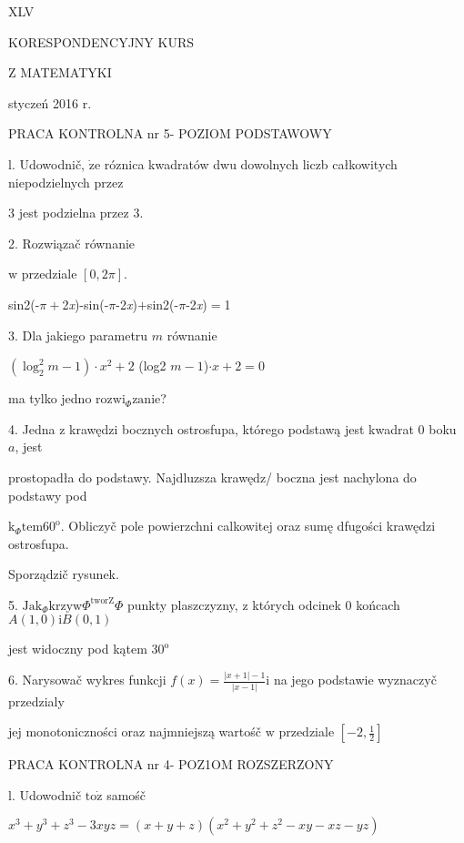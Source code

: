\documentclass[a4paper,12pt]{article}
\begin{document}
XLV

KORESPONDENCYJNY KURS

Z MATEMATYKI

styczeń 2016 r.

PRACA KONTROLNA nr 5- POZIOM PODSTAWOWY

l. Udowodnič, $\dot{\mathrm{z}}\mathrm{e}$ róznica kwadratów dwu dowolnych liczb całkowitych niepodzielnych przez

3 jest podzielna przez 3.

2. Rozwiązač równanie

$\mathrm{w}$ przedziale $[0,2\pi].$

sin2(-$\pi+$2{\it x})-sin(-$\pi$-2{\it x})$+$sin2(-$\pi$-2{\it x})$=$1

3. Dla jakiego parametru $m$ równanie

$(\log_{2}^{2}m-1)\cdot x^{2}+2$ (log2 $m-1$)$\cdot x+2=0$

ma tylko jedno $\mathrm{r}\mathrm{o}\mathrm{z}\mathrm{w}\mathrm{i}_{\Phi}\mathrm{z}\mathrm{a}\mathrm{n}\mathrm{i}\mathrm{e}$?

4. Jedna $\mathrm{z}$ krawędzi bocznych ostrosfupa, którego podstawą jest kwadrat $0$ boku $a$, jest

prostopadła do podstawy. Najdluzsza krawędz/ boczna jest nachylona do podstawy pod

$\mathrm{k}_{\Phi}\mathrm{t}\mathrm{e}\mathrm{m}60^{\mathrm{o}}$. Obliczyč pole powierzchni calkowitej oraz sumę dfugości krawędzi ostrosfupa.

Sporządzič rysunek.

5. $\mathrm{J}\mathrm{a}\mathrm{k}_{\Phi}\mathrm{k}\mathrm{r}\mathrm{z}\mathrm{y}\mathrm{w}\Phi^{\mathrm{t}\mathrm{w}\mathrm{o}\mathrm{r}\mathrm{Z}}\Phi$ punkty plaszczyzny, $\mathrm{z}$ których odcinek $0$ końcach $A(1,0)\mathrm{i}B(0,1)$

jest widoczny pod kątem $30^{\mathrm{o}}$

6. Narysowač wykres funkcji $f(x)=\displaystyle \frac{|x+1|-1}{|x-1|}\mathrm{i}$ na jego podstawie wyznaczyč przedzialy

jej monotoniczności oraz najmniejszą wartośč $\mathrm{w}$ przedziale $[-2,\displaystyle \frac{1}{2}]$




PRACA KONTROLNA nr 4- POZ1OM ROZSZERZONY

l. Udowodnič $\mathrm{t}\mathrm{o}\dot{\mathrm{z}}$ samośč

$x^{3}+y^{3}+z^{3}-3xyz=(x+y+z)(x^{2}+y^{2}+z^{2}-xy-xz-yz)$
\end{document}
